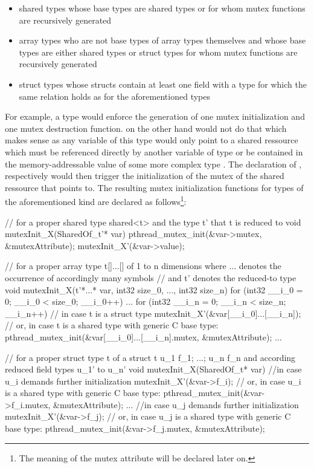 \begin{itemize}
\item shared types whose base types are shared types or for whom mutex functions are recursively generated
\item array types who are not base types of array types themselves and whose base types are either shared types or struct types for whom mutex functions are recursively generated
\item struct types whose structs contain at least one field with a type for which the same relation holds as for the aforementioned types
\end{itemize}

For example, a type  would enforce the generation of one mutex initialization and one mutex destruction function.  on the other hand would not do that which makes sense as any variable  of this type would only point to a shared ressource which must be referenced directly by another variable  of type  or be contained in the memory-addressable value of some more complex type . The declaration of , respectively  would then trigger the initialization of the mutex of the shared ressource that  points to. The resulting mutex initialization functions for types of the aforementioned kind are declared as follows\footnote{The meaning of the mutex attribute will be declared later on.}:
\begin{ccode}
// for a proper shared type shared<t> and the type t' that t is reduced to
void mutexInit_X(SharedOf_t'* var) { 
  pthread_mutex_init(&var->mutex, &mutexAttribute); 
  mutexInit_X'(&var->value); 
}

// for a proper array type t[]...[] of 1 to n dimensions where ... denotes the occurrence of accordingly many symbols 
// and t' denotes the reduced-to type
void mutexInit_X(t'*...* var, int32 size_0, ..., int32 size_n) { 
  for (int32 __i_0 = 0; __i_0 < size_0; __i_0++) { 
    ...
      for (int32 __i_n = 0; __i_n < size_n; __i_n++) {
        // in case t is a struct type
        mutexInit_X'(&var[__i_0]...[__i_n]);
        // or, in case t is a shared type with generic C base type:
        pthread_mutex_init(&var[__i_0]...[__i_n].mutex, &mutexAttribute);
      }
    ...
  } 
}

// for a proper struct type t of a struct t { u_1 f_1; ...; u_n f_n } and according reduced field types u_1' to u_n'
void mutexInit_X(SharedOf_t* var) {
  //in case u_i demands further initialization
  mutexInit_X'(&var->f_i);
  // or, in case u_i is a shared type with generic C base type:
  pthread_mutex_init(&var->f_i.mutex, &mutexAttribute);
  ...
  //in case u_j demands further initialization
  mutexInit_X'(&var->f_j);
  // or, in case u_j is a shared type with generic C base type:
  pthread_mutex_init(&var->f_j.mutex, &mutexAttribute);  
}
\end{ccode}
